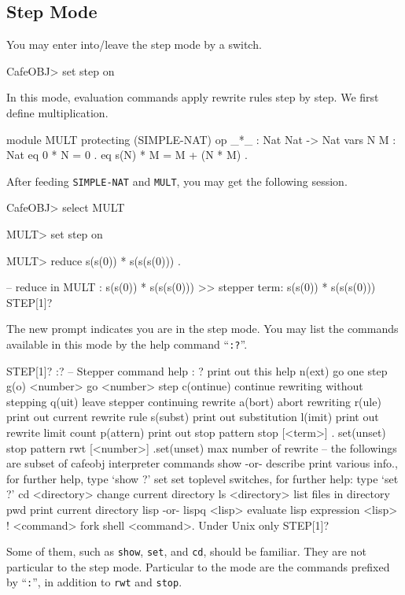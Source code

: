 \documentclass[a4paper]{memoir}
\begin{document}
\subsection{Step Mode}\label{sec:p2-step-mode}

You may enter into/leave the step mode by a switch.
\begin{vvtm}
\begin{ccode}
  CafeOBJ> set step on
\end{ccode}
\end{vvtm}
In this mode, evaluation commands apply rewrite rules
step by step. We first define multiplication.\label{exs:mult}
\begin{vvtm}
\begin{ccode}
  module MULT {
    protecting (SIMPLE-NAT)
    op _*_ : Nat Nat -> Nat
    vars N M : Nat
    eq 0 * N = 0 .
    eq s(N) * M = M + (N * M) .
  }
\end{ccode}
\end{vvtm}
After feeding \verb|SIMPLE-NAT| and \verb|MULT|,
you may get the following session.
\begin{vvtm}
\begin{ccode}
  CafeOBJ> select MULT

  MULT> set step on

  MULT> reduce s(s(0)) * s(s(s(0))) .

  -- reduce in MULT : s(s(0)) * s(s(s(0)))
  >> stepper term: s(s(0)) * s(s(s(0)))
  STEP[1]? 
\end{ccode}
\end{vvtm}
The new prompt indicates you are in the step mode.
You may list the commands available in this mode
by the help command ``\verb|:?|''.
\begin{vvtm}
\begin{ccode}
  STEP[1]? :?
  -- Stepper command help :
    ?               print out this help
    n(ext)          go one step
    g(o) <number>   go <number> step
    c(ontinue)      continue rewriting without stepping
    q(uit)          leave stepper continuing rewrite
    a(bort)         abort rewriting
    r(ule)          print out current rewrite rule
    s(subst)        print out substitution
    l(imit)         print out rewrite limit count
    p(attern)       print out stop pattern
    stop [<term>] . set(unset) stop pattern
    rwt [<number>] .set(unset) max number of rewrite
  -- the followings are subset of cafeobj interpreter commands
    show -or-
    describe        print various info., for further help, type `show ?'
    set             set toplevel switches, for further help: type `set ?'
    cd <directory>  change current directory
    ls <directory>  list files in directory
    pwd             print current directory
    lisp -or-
    lispq <lisp>    evaluate lisp expression <lisp>
    ! <command>     fork shell <command>. Under Unix only
  STEP[1]? 
\end{ccode}
\end{vvtm}
Some of them, such as \verb|show|, \verb|set|, and \verb|cd|, should be
familiar. They are not particular to the step mode. Particular to the
mode are the commands prefixed by ``\verb|:|'', in addition to
\verb|rwt| and \verb|stop|.
\end{document}
